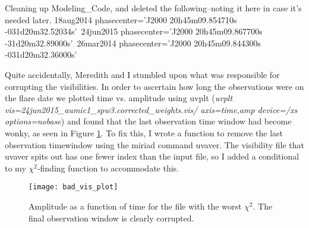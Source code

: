 \documentclass[a4paper]{tufte-handout}
\begin{document}
\hrulefill


Cleaning up Modeling\_Code, and deleted the following--noting it here in case it's needed later.
\noindent 18aug2014 phasecenter='J2000 20h45m09.854710s -031d20m32.52034s'\
24jun2015 phasecenter='J2000 20h45m09.867700s -31d20m32.89000s'\
26mar2014 phasecenter='J2000 20h45m09.844300s -031d20m32.36000s'\


\hrulefill


Quite accidentally, Meredith and I stumbled upon what was responsible for corrupting the visibilities. In order to ascertain how long the observations were on the flare date we plotted time vs. amplitude using uvplt (\textit{uvplt vis=24jun2015\_aumic1\_spw3.corrected\_weights.vis/ axis=time,amp device=/xs options=nobase}) and found that the last observation time window had become wonky, as seen in Figure \ref{fig:bad_vis}. To fix this, I wrote a function to remove the last observation timewindow using the miriad command uvaver. The visibility file that uvaver spits out has one fewer index than the input file, so I added a conditional to my $\chi^2$-finding function to accommodate this.

\begin{figure}[!ht]
  \label{fig:bad_vis}
  \centering
  \caption{Amplitude as a function of time for the file with the worst $\chi^2$. The final observation window is clearly corrupted.}

  \texttt{[image: bad\_vis\_plot]}
\end{figure}


\hrulefill

\end{document}
